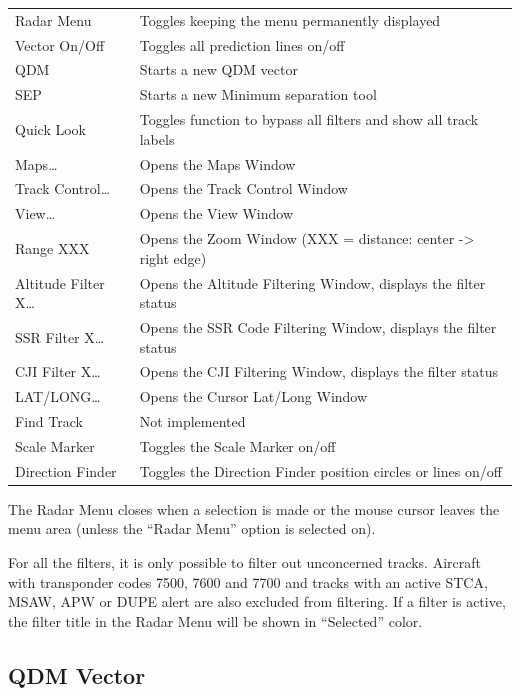 \documentclass[11pt,a4paper,oldfontcommands]{memoir}
\begin{document}
\begin{tabular}{l l}
    Radar Menu          & Toggles keeping the menu permanently displayed\\
    Vector On/Off       & Toggles all prediction lines on/off\\
    QDM                 & Starts a new QDM vector\\
    SEP                 & Starts a new Minimum separation tool\\
    Quick Look          & Toggles function to bypass all filters and show all track labels\\
    Maps…               & Opens the Maps Window\\
    Track Control…      & Opens the Track Control Window\\
    View…               & Opens the View Window\\
    Range XXX           & Opens the Zoom Window (XXX = distance: center -> right edge)\\
    Altitude Filter X…  & Opens the Altitude Filtering Window, displays the filter status\\
    SSR Filter X…       & Opens the SSR Code Filtering Window, displays the filter status\\
    CJI Filter X…       & Opens the CJI Filtering Window, displays the filter status\\
    LAT/LONG…           & Opens the Cursor Lat/Long Window\\
    Find Track          & Not implemented\\
    Scale Marker        & Toggles the Scale Marker on/off\\
    Direction Finder    & Toggles the Direction Finder position circles or lines on/off\\
\end{tabular}

The Radar Menu closes when a selection is made or the mouse cursor leaves the menu area (unless the “Radar Menu” option is selected on).

For all the filters, it is only possible to filter out unconcerned tracks. Aircraft with transponder codes 7500, 7600 and 7700 and tracks with an active STCA, MSAW, APW or DUPE alert are also excluded from filtering. If a filter is active, the filter title in the Radar Menu will be shown in “Selected” color.

\subsection{QDM Vector}
\label{qdm}
\end{document}
